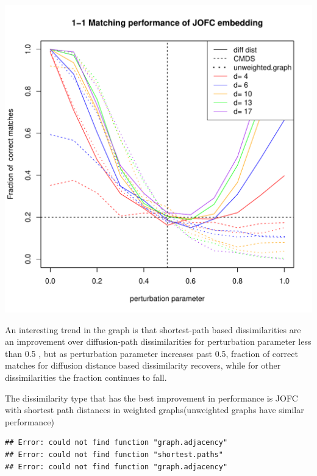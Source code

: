 \documentclass[11pt]{article} %
\begin{document}
\begin{knitrout}
\color{fgcolor}\includegraphics{graphs/FidCommPapergraph-plot-3} 
\end{knitrout}



An interesting trend in the graph is that shortest-path based dissimilarities are an improvement over diffusion-path dissimilarities for perturbation parameter less than 0.5 , but as perturbation parameter increases past 0.5, fraction of correct matches for diffusion distance based dissimilarity recovers, while for other dissimilarities the fraction continues to fall. 

The dissimilarity type that has the best improvement in performance is JOFC with shortest path distances in weighted graphs(unweighted graphs have similar performance)




\begin{knitrout}
\color{fgcolor}\begin{kframe}
\begin{verbatim}
## Error: could not find function "graph.adjacency"
## Error: could not find function "shortest.paths"
## Error: could not find function "graph.adjacency"
\end{verbatim}
\end{kframe}
\end{knitrout}
\end{document}
